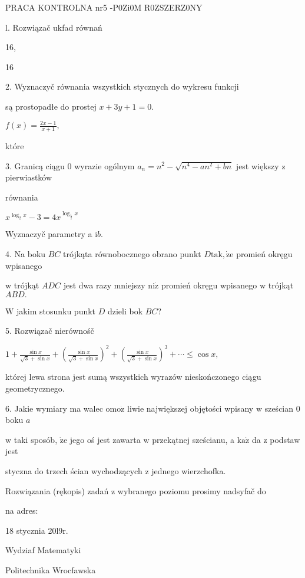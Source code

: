 \documentclass[a4paper,12pt]{article}
\begin{document}
PRACA KONTROLNA nr5 -P0Zi0M R0ZSZERZ0NY

l. Rozwiązač ukfad równań 

16,

16

2. Wyznaczyč równania wszystkich stycznych do wykresu funkcji

są prostopadłe do prostej $x+3y+1=0.$

$f(x) = \displaystyle \frac{2x-1}{x+1},$

które

3. Granicą ciągu $0$ wyrazie ogólnym $a_{n}=n^{2}-\sqrt{n^{4}-an^{2}+bn}$ jest większy $\mathrm{z}$ pierwiastków

równania

$x^{\log_{2}x}-3=4x^{\log_{\frac{1}{2}}x}$

Wyznaczyč parametry a $\mathrm{i}b.$

4. Na boku $BC$ trójkąta równobocznego obrano punkt $D\mathrm{t}\mathrm{a}\mathrm{k}, \dot{\mathrm{z}}\mathrm{e}$ promień okręgu wpisanego

$\mathrm{w}$ trójkąt $ADC$ jest dwa razy mniejszy $\mathrm{n}\mathrm{i}\dot{\mathrm{z}}$ promień okręgu wpisanego $\mathrm{w}$ trójkąt $ABD.$

$\mathrm{W}$ jakim stosunku punkt $D$ dzieli bok $BC$?

5. Rozwiązač nierównośč

$1+\displaystyle \frac{\sin x}{\sqrt{3}+\sin x}+(\frac{\sin x}{\sqrt{3}+\sin x})^{2}+(\frac{\sin x}{\sqrt{3}+\sin x})^{3}+\cdots\leq\cos x,$

której lewa strona jest sumą wszystkich wyrazów nieskończonego ciągu geometrycznego.

6. Jakie wymiary ma walec $\mathrm{o}\mathrm{m}\mathrm{o}\dot{\mathrm{z}}$ liwie największej objętości wpisany $\mathrm{w}$ sześcian $0$ boku $a$

$\mathrm{w}$ taki sposób, $\dot{\mathrm{z}}\mathrm{e}$ jego oś jest zawarta $\mathrm{w}$ przekątnej sześcianu, a $\mathrm{k}\mathrm{a}\dot{\mathrm{z}}$ da $\mathrm{z}$ podstaw jest

styczna do trzech ścian wychodzących $\mathrm{z}$ jednego wierzchofka.

Rozwiązania (rękopis) zadań z wybranego poziomu prosimy nadsyfač do

na adres:

18 stycznia 20l9r.

Wydziaf Matematyki

Politechnika Wrocfawska
\end{document}
